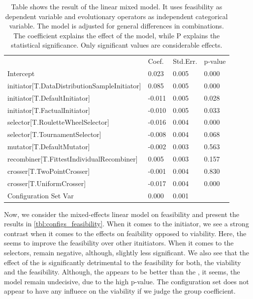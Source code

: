 \documentclass[./../../paper.tex]{subfiles}
\begin{document}
\begin{table}
    \caption{Table shows the result of the linear mixed model. It uses feasibility as dependent variable and evolutionary operators as independent categorical variable. The model is adjusted for general differences in combinations. The coefficient explains the effect of the model, while P explains the statistical significance. Only significant values are considerable effects.}
    \label{tbl:configs_feasibility}
    \begin{tabular}{llll}
                                                     & Coef.  & Std.Err. & p-value \\
        Intercept                                    & 0.023  & 0.005    & 0.000   \\
        initiator[T.DataDistributionSampleInitiator] & 0.085  & 0.005    & 0.000   \\
        initiator[T.DefaultInitiator]                & -0.011 & 0.005    & 0.028   \\
        initiator[T.FactualInitiator]                & -0.010 & 0.005    & 0.033   \\
        selector[T.RouletteWheelSelector]            & -0.016 & 0.004    & 0.000   \\
        selector[T.TournamentSelector]               & -0.008 & 0.004    & 0.068   \\
        mutator[T.DefaultMutator]                    & -0.002 & 0.003    & 0.563   \\
        recombiner[T.FittestIndividualRecombiner]    & 0.005  & 0.003    & 0.157   \\
        crosser[T.TwoPointCrosser]                   & -0.001 & 0.004    & 0.830   \\
        crosser[T.UniformCrosser]                    & -0.017 & 0.004    & 0.000   \\
        Configuration Set Var                        & 0.000  & 0.001    &         \\
    \end{tabular}
\end{table}

 Now, we consider the mixed-effects linear model on feasibility and present the results in \autoref{tbl:configs_feasibility}. When it comes to the initiator, we see a strong contrast when it comes to the effects on feaibility opposed to viability. Here, the  seems to improve the feasibility over other itnitiators. When it comes to the selectors,  remain negative, although, slightly less significant. We also see that the effect of the  is significantly detrimental to the feasibility for both, the viability and the feasibility. Although, the  appears to be better than the , it seems, the model remain undecisive, due to the high p-value. The configuration set does not appear to have any influece on the viability if we judge the group coefficient.
\end{document}

